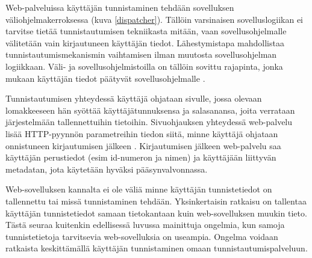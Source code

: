 Web-palveluissa käyttäjän tunnistaminen tehdään sovelluksen väliohjelmakerroksessa (kuva \ref{dispatcher}). Tällöin varsinaisen sovelluslogiikan ei tarvitse tietää tunnistautumisen tekniikasta mitään, vaan sovellusohjelmalle välitetään vain kirjautuneen käyttäjän tiedot. Lähestymistapa mahdollistaa tunnistautumismekanismin vaihtamisen ilman muutosta sovellusohjelman logiikkaan. Väli- ja sovellusohjelmistoilla on tällöin sovittu rajapinta, jonka mukaan käyttäjän tiedot päätyvät sovellusohjelmalle \cite{django}.

Tunnistautumisen yhteydessä käyttäjä ohjataan sivulle, jossa olevaan lomakkeeseen hän syöttää käyttäjätunnuksensa ja salasanansa, joita verrataan järjestelmään tallennettuihin tietoihin. Sivuohjauksen yhteydessä web-palvelu lisää HTTP-pyynnön parametreihin tiedon siitä, minne käyttäjä ohjataan onnistuneen kirjautumisen jälkeen \cite{oauth2_0}. Kirjautumisen jälkeen web-palvelu saa käyttäjän perustiedot (esim id-numeron ja nimen) ja käyttäjään liittyvän metadatan, jota käytetään hyväksi pääsynvalvonnassa.

Web-sovelluksen kannalta ei ole väliä minne käyttäjän tunnistetiedot on tallennettu tai missä tunnistaminen tehdään. Yksinkertaisin ratkaisu on tallentaa käyttäjän tunnistetiedot samaan tietokantaan kuin web-sovelluksen muukin tieto. Tästä seuraa kuitenkin edellisessä luvussa mainittuja ongelmia, kun samoja tunnistetietoja tarvitsevia web-sovelluksia on useampia. Ongelma voidaan ratkaista keskittämällä käyttäjän tunnistaminen omaan tunnistautumispalveluun.